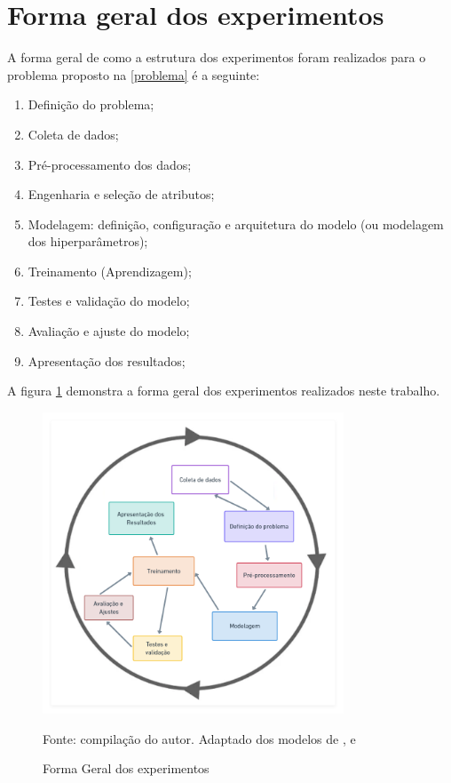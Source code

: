 \section{Forma geral dos experimentos}\label{forma_geral_experimentos}
A forma geral de como a estrutura dos experimentos foram realizados para o problema proposto na \autoref{problema} é a seguinte:
\begin{enumerate}
	\item Definição do problema;
	\item Coleta de dados;
	\item Pré-processamento dos dados;
	\item Engenharia e seleção de atributos;
	\item Modelagem: definição, configuração e arquitetura do modelo (ou modelagem dos hiperparâmetros);
	\item Treinamento (Aprendizagem);
	\item Testes e validação do modelo;
	\item Avaliação e ajuste do modelo;
	\item Apresentação dos resultados;
\end{enumerate}

A figura \ref{fig:metodologia} demonstra a forma geral dos experimentos realizados neste trabalho.

\begin{figure}[!h]
	\centering
	\caption{Forma Geral dos experimentos}
	\includegraphics[width=0.8\textwidth]{imagens/metodologia3.png}	
	
	\label{fig:metodologia}
	{\scriptsize Fonte: compilação do autor. Adaptado dos modelos de ,  e }
\end{figure}


